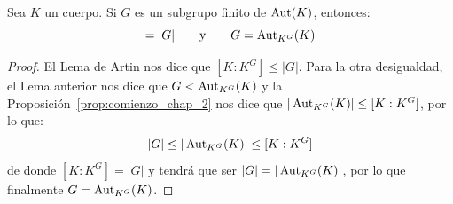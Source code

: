 \begin{teo}\label{teo:antes_teo_angular}
    Sea $K$ un cuerpo. Si $G$ es un subgrupo finito de $\operatorname{Aut}(K)$, entonces:
    \begin{equation*}
        [K:K^G] = |G| \qquad \text{y}\qquad G = \Aut_{K^G}(K)
    \end{equation*}
    \begin{proof}
        El Lema de Artin nos dice que $[K:K^G]\leq |G|$. Para la otra desigualdad, el Lema anterior nos dice que $G<\operatorname{Aut}_{K^G}(K)$ y la Proposición~\ref{prop:comienzo_chap_2} nos dice que $|\operatorname{Aut}_{K^G}(K)|\leq [K:K^G]$, por lo que:
        \begin{equation*}
            |G| \leq |\operatorname{Aut}_{K^G}(K)| \leq [K:K^G]
        \end{equation*}
        de donde $[K:K^G] = |G|$ y tendrá que ser $|G| = |\operatorname{Aut}_{K^G}(K)|$, por lo que finalmente $G = \operatorname{Aut}_{K^G}(K)$.
    \end{proof}
\end{teo}

